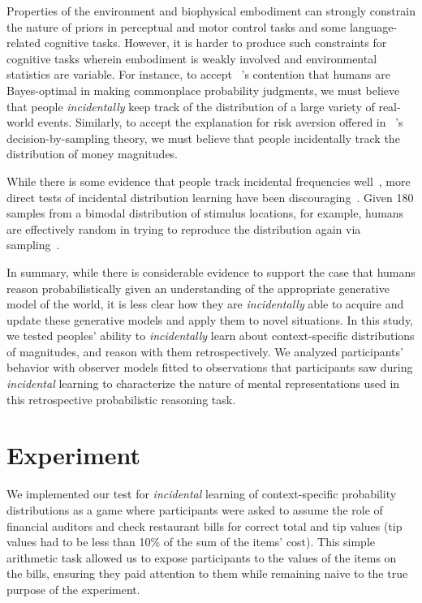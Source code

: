 \documentclass[10pt,letterpaper]{article}
\begin{document}
Properties of the environment and biophysical embodiment can strongly constrain the nature of priors in perceptual and motor control tasks and some language-related cognitive tasks. However, it is harder to produce such constraints for cognitive tasks wherein embodiment is weakly involved and environmental statistics are variable. For instance, to accept ~'s contention that humans are Bayes-optimal in making commonplace probability judgments, we must believe that people {\em incidentally} keep track of the distribution of a large variety of real-world events. Similarly, to accept the explanation for risk aversion offered in ~'s decision-by-sampling theory, we must believe that people incidentally track the distribution of money magnitudes. 

While there is some evidence that people track incidental frequencies well~\cite{hz84}, more direct tests of incidental distribution learning have been discouraging~\cite{sailor2005memory, tvp17}. Given 180 samples from a bimodal distribution of stimulus locations, for example, humans are effectively random in trying to reproduce the distribution again via sampling~\cite{tvp17}. 

In summary, while there is considerable evidence to support the case that humans reason probabilistically given an understanding of the appropriate generative model of the world, it is less clear how they are {\em incidentally} able to acquire and update these generative models and apply them to novel situations. In this study, we tested peoples' ability to {\em incidentally} learn about context-specific distributions of magnitudes, and reason with them retrospectively. We analyzed participants' behavior with observer models fitted to observations that participants saw during {\em incidental} learning to characterize the nature of mental representations used in this retrospective probabilistic reasoning task.

\section{Experiment}


We implemented our test for {\em incidental} learning of context-specific probability distributions as a game where participants were asked to assume the role of financial auditors and check restaurant bills for correct total and tip values (tip values had to be less than 10\% of the sum of the items' cost). This simple arithmetic task allowed us to expose participants to the values of the items on the bills, ensuring they paid attention to them while remaining naive to the true purpose of the experiment. 
	
\end{document}
